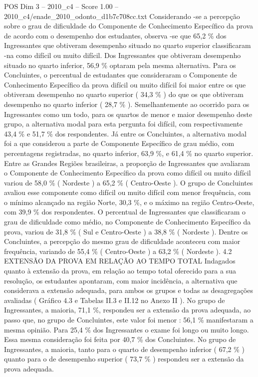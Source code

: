 \begin{textsample}{POS Dim 3 – 2010\_c4 – Score 1.00 – 2010\_c4/enade\_2010\_odonto\_d1b7c708cc.txt}
Considerando -se a percepção sobre o grau de dificuldade do Componente de Conhecimento Específico da prova de acordo com o desempenho dos estudantes, observa -se que 65,2 \% dos Ingressantes que obtiveram desempenho situado no quarto superior classificaram -na como difícil ou muito difícil.
Dos Ingressantes que obtiveram desempenho situado no quarto inferior, 56,9 \% optaram pela mesma alternativa.
Para os Concluintes, o percentual de estudantes que consideraram o Componente de Conhecimento Específico da prova difícil ou muito difícil foi maior entre os que obtiveram desempenho no quarto superior ( 34,3 \% ) do que os que obtiveram desempenho no quarto inferior ( 28,7 \% ).
Semelhantemente ao ocorrido para os Ingressantes como um todo, para os quartos de menor e maior desempenho deste grupo, a alternativa modal para esta pergunta foi difícil, com respectivamente 43,4 \% e 51,7 \% dos respondentes.
Já entre os Concluintes, a alternativa modal foi a que considerou a parte de Componente Específico de grau médio, com percentagens registradas, no quarto inferior, 63,9 \%, e 61,4 \% no quarto superior.
Entre as Grandes Regiões brasileiras, a proporção de Ingressantes que avaliaram o Componente de Conhecimento Específico da prova como difícil ou muito difícil variou de 58,0 \% ( Nordeste ) a 65,2 \% ( Centro-Oeste ).
O grupo de Concluintes avaliou esse componente como difícil ou muito difícil com menor frequência, com o mínimo alcançado na região Norte, 30,3 \%, e o máximo na região Centro-Oeste, com 39,9 \% dos respondentes.
O percentual de Ingressantes que classificaram o grau de dificuldade como médio, no Componente de Conhecimento Específico da prova, variou de 31,8 \% ( Sul e Centro-Oeste ) a 38,8 \% ( Nordeste ).
Dentre os Concluintes, a percepção do mesmo grau de dificuldade aconteceu com maior frequência, variando de 55,4 \% ( Centro-Oeste ) a 63,2 \% ( Nordeste ). 4.2 EXTENSÃO DA PROVA EM RELAÇÃO AO TEMPO TOTAL Indagados quanto à extensão da prova, em relação ao tempo total oferecido para a sua resolução, os estudantes apontaram, com maior incidência, a alternativa que considerava a extensão adequada, para ambos os grupos e todas as desagregações avaliadas ( Gráfico 4.3 e Tabelas II.3 e II.12 no Anexo II ).
No grupo de Ingressantes, a maioria, 71,1 \%, respondeu ser a extensão da prova adequada, ao passo que, no grupo de Concluintes, este valor foi menor : 56,1 \% manifestaram a mesma opinião.
Para 25,4 \% dos Ingressantes o exame foi longo ou muito longo.
Essa mesma consideração foi feita por 40,7 \% dos Concluintes.
No grupo de Ingressantes, a maioria, tanto para o quarto de desempenho inferior ( 67,2 \% ) quanto para o de desempenho superior ( 73,7 \% ) respondeu ser a extensão da prova adequada.

\end{textsample}
